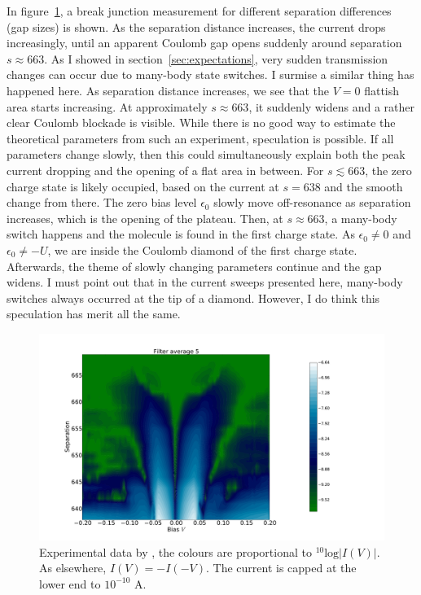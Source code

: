 In figure~\ref{fig:perrindata}, a break junction measurement for different separation differences (gap sizes) is shown. As the separation distance increases, the current drops increasingly, until an apparent Coulomb gap opens suddenly around separation $s \approx 663$. As I showed in section~\ref{sec:expectations}, very sudden transmission changes can occur due to many-body state switches. I surmise a similar thing has happened here. As separation distance increases, we see that the $V=0$ flattish area starts increasing. At approximately $s\approx 663$, it suddenly widens and a rather clear Coulomb blockade is visible. While there is no good way to estimate the theoretical parameters from such an experiment, speculation is possible. If all parameters change slowly, then this could simultaneously explain both the peak current dropping and the opening of a flat area in between. For $s \lesssim 663$, the zero charge state is likely occupied, based on the current at $s = 638$ and the smooth change from there. The zero bias level $\epsilon_0$ slowly move off-resonance as separation increases, which is the opening of the plateau. Then, at $s \approx 663$, a many-body switch happens and the molecule is found in the first charge state. As $\epsilon_0 \neq 0 $ and $\epsilon_0 \neq -U$, we are inside the Coulomb diamond of the first charge state. Afterwards, the theme of slowly changing parameters continue and the gap widens. I must point out that in the current sweeps presented here, many-body switches always occurred at the tip of a diamond. However, I do think this speculation has merit all the same.
\begin{figure}[h]
    \centering
    \includegraphics[width=.99\textwidth,clip=true, trim=4cm 0cm 10cm 4cm]{pdf/perrin_experiment_abs.pdf}
    \caption{Experimental data by \citet{perrinnano}, the colours are proportional to $^{10}\text{log}\left|I(V)\right|$. As elsewhere, $I(V) = -I(-V)$. The current is capped at the lower end to $10^{-10}$ A.}
    \label{fig:perrindata}
\end{figure}

